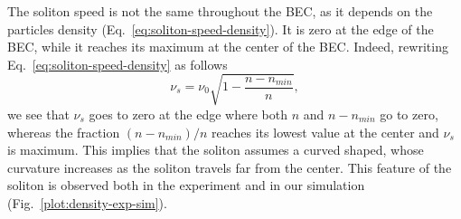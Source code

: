 The soliton speed is not the same throughout the BEC, as it depends on the particles density (Eq.~\eqref{eq:soliton-speed-density}). It is zero at the edge of the BEC, while it reaches its maximum at the center of the BEC. Indeed, rewriting Eq.~\eqref{eq:soliton-speed-density} as follows
\begin{equation}
\nu_s = \nu_0 \sqrt{1 - \frac{n - n_{min}}{n}},
\end{equation}
we see that $\nu_s$ goes to zero at the edge where both $n$ and $n - n_{min}$ go to zero, whereas the fraction $(n - n_{min}) / n$ reaches its lowest value at the center and $\nu_s$ is maximum. This implies that the soliton assumes a curved shaped, whose
 curvature increases as the soliton travels far from the center. This feature of the soliton is observed both in the experiment and in our simulation (Fig.~\ref{plot:density-exp-sim}). 

